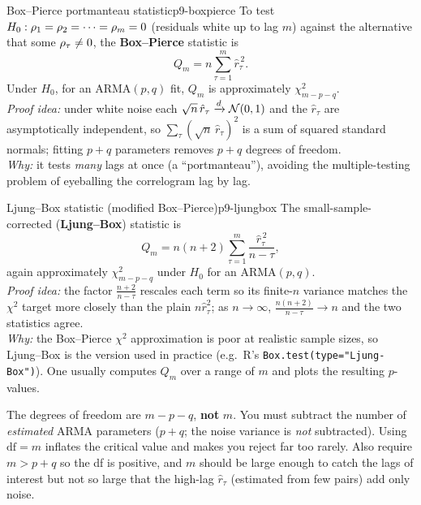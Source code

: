 \begin{proposition}{Box--Pierce portmanteau statistic}{p9-boxpierce}
To test $H_0:\rho_1=\rho_2=\cdots=\rho_m=0$ (residuals white up to lag $m$)
against the alternative that some $\rho_\tau\ne0$, the \textbf{Box--Pierce}
statistic is
\[
Q_m = n\sum_{\tau=1}^{m}\hat r_\tau^{\,2}.
\]
Under $H_0$, for an ARMA$(p,q)$ fit, $Q_m$ is approximately
$\chi^2_{m-p-q}$.\\
\textit{Proof idea:} under white noise each $\sqrt n\,\hat r_\tau\xrightarrow{d}
\mathcal N(0,1)$ and the $\hat r_\tau$ are asymptotically independent, so
$\sum_\tau(\sqrt n\,\hat r_\tau)^2$ is a sum of squared standard normals; fitting
$p+q$ parameters removes $p+q$ degrees of freedom.\\
\textit{Why:} it tests \emph{many} lags at once (a ``portmanteau''), avoiding the
multiple-testing problem of eyeballing the correlogram lag by lag.
\end{proposition}

\begin{proposition}{Ljung--Box statistic (modified Box--Pierce)}{p9-ljungbox}
The small-sample-corrected (\textbf{Ljung--Box}) statistic is
\[
Q_m = n(n+2)\sum_{\tau=1}^{m}\frac{\hat r_\tau^{\,2}}{n-\tau},
\]
again approximately $\chi^2_{m-p-q}$ under $H_0$ for an ARMA$(p,q)$.\\
\textit{Proof idea:} the factor $\frac{n+2}{n-\tau}$ rescales each term so its
finite-$n$ variance matches the $\chi^2$ target more closely than the plain
$n\hat r_\tau^2$; as $n\to\infty$, $\frac{n(n+2)}{n-\tau}\to n$ and the two
statistics agree.\\
\textit{Why:} the Box--Pierce $\chi^2$ approximation is poor at realistic sample
sizes, so Ljung--Box is the version used in practice (e.g.\ R's
\texttt{Box.test(type="Ljung-Box")}). One usually computes $Q_m$ over a range of
$m$ and plots the resulting $p$-values.
\end{proposition}

\begin{pitfall}
The degrees of freedom are $m-p-q$, \textbf{not} $m$. You must subtract the
number of \emph{estimated} ARMA parameters ($p+q$; the noise variance is
\emph{not} subtracted). Using $\mathrm{df}=m$ inflates the critical value and
makes you reject far too rarely. Also require $m>p+q$ so the df is positive, and
$m$ should be large enough to catch the lags of interest but not so large that
the high-lag $\hat r_\tau$ (estimated from few pairs) add only noise.
\end{pitfall}

